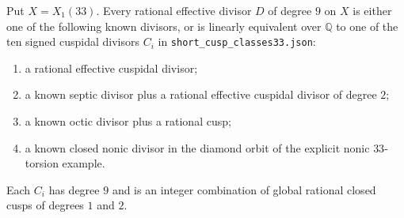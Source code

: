 \begin{proposition}\label{prop:nonic33-finite-classes}
Put $X=X_1(33)$. Every rational effective divisor $D$ of degree $9$
on $X$ is either one of the following known divisors, or is linearly
equivalent over $\mathbb Q$ to one of the ten signed cuspidal divisors
$C_i$ in \texttt{short\_cusp\_classes33.json}:
\begin{enumerate}
\item a rational effective cuspidal divisor;
\item a known septic divisor plus a rational effective cuspidal divisor
of degree $2$;
\item a known octic divisor plus a rational cusp;
\item a known closed nonic divisor in the diamond orbit of the
explicit nonic $33$-torsion example.
\end{enumerate}
Each $C_i$ has degree $9$ and is an integer combination of global
rational closed cusps of degrees $1$ and $2$.
\end{proposition}
